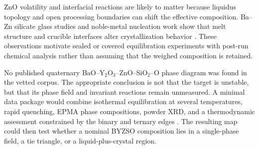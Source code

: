 ZnO volatility and interfacial reactions are likely to matter because liquidus topology and open processing boundaries can shift the effective composition. Ba--Zn silicate glass studies and noble-metal nucleation work show that melt structure and crucible interfaces alter crystallization behavior \cite{moulton2021a,thieme2022noble,han2025computational}. These observations motivate sealed or covered equilibration experiments with post-run chemical analysis rather than assuming that the weighed composition is retained.

No published quaternary BaO--Y$_2$O$_3$--ZnO--SiO$_2$--O phase diagram was found in the vetted corpus. The appropriate conclusion is not that the target is unstable, but that its phase field and invariant reactions remain unmeasured. A minimal data package would combine isothermal equilibration at several temperatures, rapid quenching, EPMA phase compositions, powder XRD, and a thermodynamic assessment constrained by the binary and ternary edges \cite{shevchenko2021integrated,walters2026constructing,derensy2026phase}. The resulting map could then test whether a nominal BYZSO composition lies in a single-phase field, a tie triangle, or a liquid-plus-crystal region.
